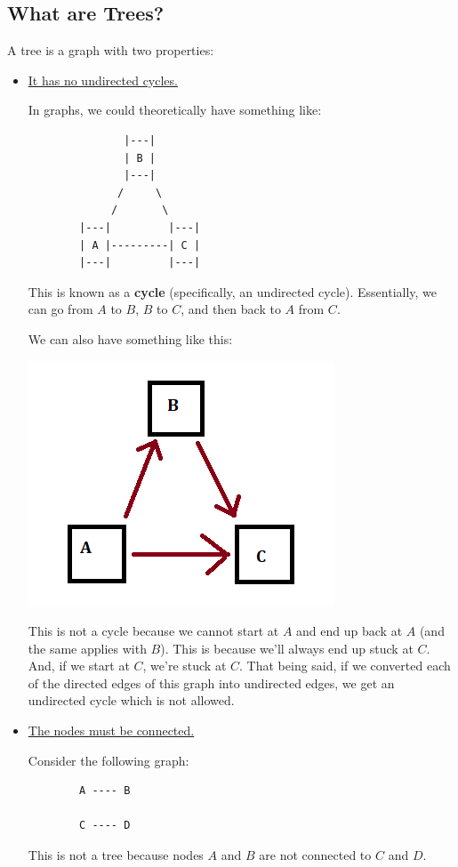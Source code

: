 \documentclass[letterpaper]{article}
\begin{document}
\subsection{What are Trees?}
A tree is a graph with two properties: 
\begin{itemize}
    \item \underline{It has no undirected cycles.}
    
    \bigskip 

    In graphs, we could theoretically have something like: 
    \begin{verbatim}
               |---|
               | B |
               |---|
              /     \
             /       \
        |---|         |---|
        | A |---------| C |
        |---|         |---|
    \end{verbatim}
    This is known as a \textbf{cycle} (specifically, an undirected cycle). Essentially, we can go from $A$ to $B$, $B$ to $C$, and then back to $A$ from $C$.
    
    \bigskip 

    We can also have something like this: 
    \begin{center}
        \includegraphics[scale=0.5]{img/graph_dir_cycle.PNG}
    \end{center}
    This is not a cycle because we cannot start at $A$ and end up back at $A$ (and the same applies with $B$). This is because we'll always end up stuck at $C$. And, if we start at $C$, we're stuck at $C$. That being said, if we converted each of the directed edges of this graph into undirected edges, we get an undirected cycle which is not allowed. 

    \item \underline{The nodes must be connected.} 
    
    \bigskip 

    Consider the following graph:
    \begin{verbatim}
        A ---- B

        C ---- D
    \end{verbatim}
    This is not a tree because nodes $A$ and $B$ are not connected to $C$ and $D$. 
\end{itemize}
\end{document}
